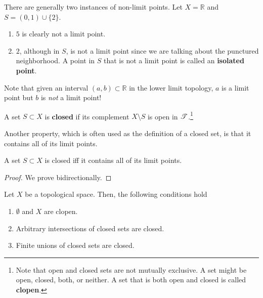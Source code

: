   \begin{example}
    There are generally two instances of non-limit points. Let $X = \mathbb{R}$ and $S = (0, 1) \cup \{2\}$. 
    \begin{enumerate}
      \item $5$ is clearly not a limit point. 
      \item $2$, although in $S$, is not a limit point since we are talking about the punctured neighborhood. A point in $S$ that is not a limit point is called an \textbf{isolated point}. 
    \end{enumerate}
  \end{example}

  \begin{example}
    Note that given an interval $(a, b) \subset \mathbb{R}$ in the lower limit topology, $a$ is a limit point but $b$ is \textit{not} a limit point!
  \end{example}

  \begin{definition}
    A set $S \subset X$ is \textbf{closed} if its complement $X \setminus S$ is open in $\operatorname{\mathscr{T}}$.\footnote{Note that open and closed sets are not mutually exclusive. A set might be open, closed, both, or neither. A set that is both open and closed is called \textbf{clopen}.}
  \end{definition}
  
  Another property, which is often used as the definition of a closed set, is that it contains all of its limit points. 

  \begin{lemma}
    A set $S \subset X$ is closed iff it contains all of its limit points. 
  \end{lemma}
  \begin{proof}
    We prove bidirectionally. 
  \end{proof}

  \begin{theorem}
    Let $X$ be a topological space. Then, the following conditions hold
    \begin{enumerate}
      \item $\emptyset$ and $X$ are clopen.
      \item Arbitrary intersections of closed sets are closed. 
      \item Finite unions of closed sets are closed. 
    \end{enumerate}
  \end{theorem}

